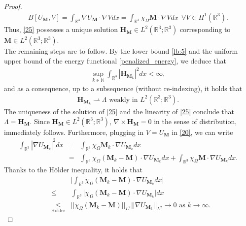 \documentclass{article}
\begin{document}
\begin{proof}
\begin{eqnarray}\label{20}
B[U_{\textbf{M}}, V] = \int_{\mathbb R^3}\nabla U_{\textbf{M}}\cdot\nabla V dx = \int_{\mathbb R^3}\chi_{\Omega}\textbf{M}\cdot \nabla Vdx~~\forall V\in H^1\left(\mathbb R^3\right).
\end{eqnarray}
Thus, \eqref{25} possesses a unique solution $\textbf{H}_{\textbf{M}}\in L^2\left(\mathbb R^3; \mathbb R^3\right)$ corresponding to $\textbf{M}\in L^2\left(\mathbb R^3; \mathbb R^3\right)$.\\
The remaining steps are to follow.
By the lower bound \eqref{lb:5} and the uniform upper bound of the energy functional \eqref{penalized_energy}, we deduce that
\begin{eqnarray}
\sup_{k\in \mathbb N}\int_{\mathbb R^3}|\textbf{H}_{\textbf{M}_k}|^2dx<\infty,\label{eq:bound-str}
\end{eqnarray}
and as a consequence, up to a subsequence (without re-indexing), it holds that 
\begin{eqnarray}
\textbf{H}_{\textbf{M}_k}\rightharpoonup \Lambda \mbox{ weakly in } L^2\left(\mathbb R^3; \mathbb R^3\right).\label{eq:weak-str}
\end{eqnarray}
The uniqueness of the solution of \eqref{25} and the linearity of \eqref{25} conclude that $\Lambda=\textbf{H}_{\textbf{M}}$. Since $\textbf{H}_{\textbf{M}}\in L^2\left(\mathbb R^3; \mathbb R^3\right)$, $\nabla\times \textbf{H}_{\textbf{M}}= 0$ in the sense of distribution, immediately follows. Furthermore, plugging in $V=U_{\textbf{M}}$ in \eqref{20}, we can write
\begin{eqnarray}
\int_{\mathbb R^3}|\nabla U_{\textbf{M}_k}|^2dx&=&\int_{\mathbb R^3}\chi_{\Omega}\textbf{M}_k\cdot\nabla U_{\textbf{M}_k}dx\nonumber\\
&=& \int_{\mathbb R^3}\chi_{\Omega}\left(\textbf{M}_k-\textbf{M}\right)\cdot\nabla U_{\textbf{M}_k}dx+\int_{\mathbb R^3}\chi_{\Omega}\textbf{M}\cdot\nabla U_{\textbf{M}_k}dx.\label{eq:strg-str}
\end{eqnarray}
Thanks to the H\"older inequality, it holds that
\begin{eqnarray}
& &\bigg|\int_{\mathbb R^3}\chi_{\Omega}\left(\textbf{M}_k-\textbf{M}\right)\cdot\nabla U_{\textbf{M}_k}dx\bigg|\nonumber\\
&\le&\int_{\mathbb R^3}\bigg|\chi_{\Omega}\left(\textbf{M}_k-\textbf{M}\right)\cdot\nabla U_{\textbf{M}_k}\bigg|dx\nonumber\\
&\underset{\mbox{H\"older}}{\le}& ||\chi_{\Omega}\left(\textbf{M}_k-\textbf{M}\right)||_{L^2}||\nabla U_{\textbf{M}_{k}}||_{L^2}\rightarrow 0 \mbox{ as } k\rightarrow\infty.\label{eq:Hol}

\end{eqnarray}
\end{proof}
\end{document}
